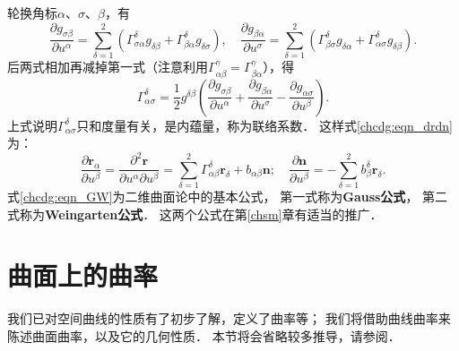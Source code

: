轮换角标$\alpha$、$\sigma $、$\beta$，有
\begin{equation}
    \frac{\partial g_{\sigma\beta}}{\partial u^\alpha} =   \sum_{\delta=1}^{2} 
    \left(\Gamma_{\sigma\alpha}^\delta g_{\delta \beta} + \Gamma_{\beta\alpha}^\delta g_{\delta \sigma} \right) , \quad
    \frac{\partial g_{\beta\alpha}}{\partial u^\sigma} =   \sum_{\delta=1}^{2} 
    \left(\Gamma_{\beta \sigma}^\delta g_{\delta \alpha} + \Gamma_{\alpha \sigma}^\delta g_{\delta \beta} \right) .
\end{equation}
后两式相加再减掉第一式（注意利用$\Gamma^\gamma_{\alpha \beta}=\Gamma^\gamma_{\beta\alpha}$），得
\begin{equation}\label{chcdg:eqn_Christoffel}
    \Gamma_{\alpha\sigma}^\delta = \frac{1}{2} g^{\delta \beta}\left(\frac{\partial g_{\sigma\beta}}{\partial u^\alpha}
    +\frac{\partial g_{\beta\alpha}}{\partial u^\sigma}-\frac{\partial g_{\alpha \sigma}}{\partial u^\beta} \right) .
\end{equation}
上式说明$\Gamma_{\alpha \sigma}^\delta$只和度量有关，是内蕴量，称为{\heiti 联络系数}．
这样式\eqref{chcdg:eqn_drdn}为：
\begin{equation}\label{chcdg:eqn_GW}
    \frac{\partial \boldsymbol{r}_\alpha}{\partial u^\beta} 
    =\frac{\partial^2 \boldsymbol{r}}{\partial u^\alpha\partial u^\beta}
    = \sum_{\delta=1}^{2}\Gamma_{\alpha \beta}^\delta 
    \boldsymbol{r}_\delta + b_{\alpha \beta} \boldsymbol{n};\quad
    \frac{\partial \boldsymbol{n}}{\partial u^\beta} = 
    -\sum_{\delta=1}^{2} b_{\beta}^\delta \boldsymbol{r}_\delta .
\end{equation}
式\eqref{chcdg:eqn_GW}为二维曲面论中的{\heiti 基本公式}，
第一式称为{\bfseries \heiti Gauss公式}，
第二式称为{\bfseries \heiti Weingarten公式}．
这两个公式在第\ref{chsm}章有适当的推广．






\section{曲面上的曲率}
我们已对空间曲线的性质有了初步了解，定义了曲率等；
我们将借助曲线曲率来陈述曲面曲率，以及它的几何性质．
本节将会省略较多推导，请参阅\parencite[\S 2.4]{subq-2016}．

